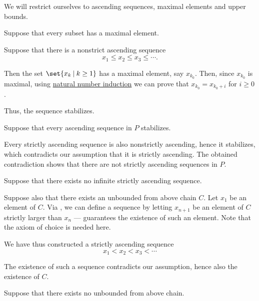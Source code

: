 \begin{defproof}
  We will restrict ourselves to ascending sequences, maximal elements and upper bounds.

   Suppose that every subset has a maximal element.

  Suppose that there is a nonstrict ascending sequence
  \begin{equation*}
    x_1 \leq x_2 \leq x_3 \leq \cdots.
  \end{equation*}

  Then the set \( \set{ x_k \given k \geq 1 } \) has a maximal element, say \( x_{k_0} \). Then, since \( x_{k_0} \) is maximal, using \hyperref[con:induction/peano_arithmetic]{natural number induction} we can prove that \( x_{k_0} = x_{k_0 + i} \) for \( i \geq 0 \).

  Thus, the sequence stabilizes.

   Suppose that every ascending sequence in \( P \) stabilizes.

  Every strictly ascending sequence is also nonstrictly ascending, hence it stabilizes, which contradicts our assumption that it is strictly ascending. The obtained contradiction shows that there are not strictly ascending sequences in \( P \).

   Suppose that there exists no infinite strictly ascending sequence.

  Suppose also that there exists an unbounded from above chain \( C \). Let \( x_1 \) be an element of \( C \). Via , we can define a sequence by letting \( x_{n+1} \) be an element of \( C \) strictly larger than \( x_n \) ---  guarantees the existence of such an element. Note that the axiom of choice is needed here.

  We have thus constructed a strictly ascending sequence
  \begin{equation*}
    x_1 < x_2 < x_3 < \cdots
  \end{equation*}

  The existence of such a sequence contradicts our assumption, hence also the existence of \( C \).

   Suppose that there exists no unbounded from above chain.


\end{defproof}
